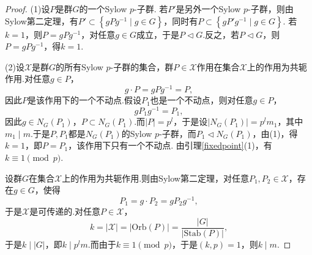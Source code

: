 \documentclass[12pt]{ctexart}
\theoremstyle{definition}
\theoremstyle{plain}
\newcommand{\Orb}{\mathrm{Orb}}
\newcommand{\Stab}{\mathrm{Stab}}
\begin{document}
	\begin{proof}
		(1)设$P$是群$G$的一个Sylow $p$-子群. 若$P'$是另外一个Sylow $p$-子群，则由Sylow第二定理，有$P'\subset\left\{gPg^{-1}\mid g\in G\right\}$，同时有$P\subset\left\{gP'g^{-1}\mid g\in G\right\}$. 若$k=1$，则$P=gPg^{-1}$，对任意$g\in G$成立，于是$P\lhd G$.反之，若$P\lhd G$，则$P=gPg^{-1}$，得$k=1$.
		
		(2)设$\mathcal{X}$是群$G$的所有Sylow $p$-子群的集合，群$P\in\mathcal{X}$作用在集合$\mathcal{X}$上的作用为共轭作用.对任意$g\in P$，
		$$g\cdot P=gPg^{-1}=P,$$
		因此$P$是该作用下的一个不动点.假设$P_1$也是一个不动点，则对任意$g\in P$，
		$$gP_1g^{-1}=P_1,$$
		因此$g\in N_G(P_1)$，$P\subset N_G(P_1)$.而$|P|=p^l$，于是设$|N_G(P_1)|=p^lm_1$，其中$m_1\mid m$.于是$P,P_1$都是$N_G(P_1)$的Sylow $p$-子群，而$P_1\lhd N_G(P_1)$，由(1)，得$k=1$，即$P=P_1$，该作用下只有一个不动点. 由引理\ref{fixedpoint}(1)，有$k\equiv 1\pmod p$.
		
		设群$G$在集合$\mathcal{X}$上的作用为共轭作用.则由Sylow第二定理，对任意$P_1,P_2\in\mathcal{X}$，存在$g\in G$，使得
		$$P_1=g\cdot P_2=gP_2g^{-1},$$
		于是$\mathcal{X}$是可传递的.对任意$P\in\mathcal{X}$，
		$$k=|\mathcal{X}|=|\Orb(P)|=\frac{|G|}{|\Stab(P)|},$$
		于是$k\mid|G|$，即$k\mid p^lm$.而由于$k\equiv 1\pmod p$，于是$(k,p)=1$，则$k\mid m$.
	\end{proof}
	
\end{document}
